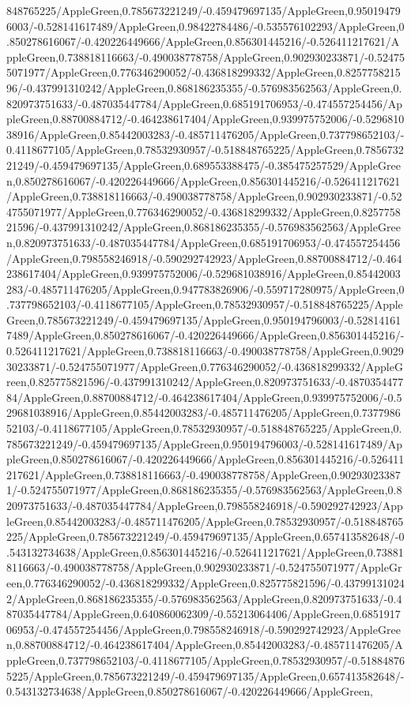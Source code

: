 {\begin{tikzternal}
{848765225/AppleGreen,0.785673221249/-0.459479697135/AppleGreen,0.950194796003/-0.528141617489/AppleGreen,0.98422784486/-0.535576102293/AppleGreen,0.850278616067/-0.420226449666/AppleGreen,0.856301445216/-0.526411217621/AppleGreen,0.738818116663/-0.490038778758/AppleGreen,0.902930233871/-0.524755071977/AppleGreen,0.776346290052/-0.436818299332/AppleGreen,0.825775821596/-0.437991310242/AppleGreen,0.868186235355/-0.576983562563/AppleGreen,0.820973751633/-0.487035447784/AppleGreen,0.685191706953/-0.474557254456/AppleGreen,0.88700884712/-0.464238617404/AppleGreen,0.939975752006/-0.529681038916/AppleGreen,0.85442003283/-0.485711476205/AppleGreen,0.737798652103/-0.4118677105/AppleGreen,0.78532930957/-0.518848765225/AppleGreen,0.785673221249/-0.459479697135/AppleGreen,0.689553388475/-0.385475257529/AppleGreen,0.850278616067/-0.420226449666/AppleGreen,0.856301445216/-0.526411217621/AppleGreen,0.738818116663/-0.490038778758/AppleGreen,0.902930233871/-0.524755071977/AppleGreen,0.776346290052/-0.436818299332/AppleGreen,0.825775821596/-0.437991310242/AppleGreen,0.868186235355/-0.576983562563/AppleGreen,0.820973751633/-0.487035447784/AppleGreen,0.685191706953/-0.474557254456/AppleGreen,0.798558246918/-0.590292742923/AppleGreen,0.88700884712/-0.464238617404/AppleGreen,0.939975752006/-0.529681038916/AppleGreen,0.85442003283/-0.485711476205/AppleGreen,0.947783826906/-0.559717280975/AppleGreen,0.737798652103/-0.4118677105/AppleGreen,0.78532930957/-0.518848765225/AppleGreen,0.785673221249/-0.459479697135/AppleGreen,0.950194796003/-0.528141617489/AppleGreen,0.850278616067/-0.420226449666/AppleGreen,0.856301445216/-0.526411217621/AppleGreen,0.738818116663/-0.490038778758/AppleGreen,0.902930233871/-0.524755071977/AppleGreen,0.776346290052/-0.436818299332/AppleGreen,0.825775821596/-0.437991310242/AppleGreen,0.820973751633/-0.487035447784/AppleGreen,0.88700884712/-0.464238617404/AppleGreen,0.939975752006/-0.529681038916/AppleGreen,0.85442003283/-0.485711476205/AppleGreen,0.737798652103/-0.4118677105/AppleGreen,0.78532930957/-0.518848765225/AppleGreen,0.785673221249/-0.459479697135/AppleGreen,0.950194796003/-0.528141617489/AppleGreen,0.850278616067/-0.420226449666/AppleGreen,0.856301445216/-0.526411217621/AppleGreen,0.738818116663/-0.490038778758/AppleGreen,0.902930233871/-0.524755071977/AppleGreen,0.868186235355/-0.576983562563/AppleGreen,0.820973751633/-0.487035447784/AppleGreen,0.798558246918/-0.590292742923/AppleGreen,0.85442003283/-0.485711476205/AppleGreen,0.78532930957/-0.518848765225/AppleGreen,0.785673221249/-0.459479697135/AppleGreen,0.657413582648/-0.543132734638/AppleGreen,0.856301445216/-0.526411217621/AppleGreen,0.738818116663/-0.490038778758/AppleGreen,0.902930233871/-0.524755071977/AppleGreen,0.776346290052/-0.436818299332/AppleGreen,0.825775821596/-0.437991310242/AppleGreen,0.868186235355/-0.576983562563/AppleGreen,0.820973751633/-0.487035447784/AppleGreen,0.640860062309/-0.55213064406/AppleGreen,0.685191706953/-0.474557254456/AppleGreen,0.798558246918/-0.590292742923/AppleGreen,0.88700884712/-0.464238617404/AppleGreen,0.85442003283/-0.485711476205/AppleGreen,0.737798652103/-0.4118677105/AppleGreen,0.78532930957/-0.518848765225/AppleGreen,0.785673221249/-0.459479697135/AppleGreen,0.657413582648/-0.543132734638/AppleGreen,0.850278616067/-0.420226449666/AppleGreen,}
\end{tikzternal}}
